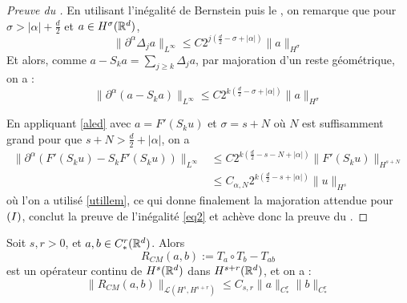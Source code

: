 \documentclass[11pt,a4paper]{article}
\begin{document}
\begin{proof}[Preuve du ]
En utilisant l'inégalité de Bernstein puis le , on remarque que pour $\sigma > |\alpha| + \frac{d}{2}$ et $a\in H^\sigma(\mathbb R^d)$,
\begin{equation*}
\|\partial^\alpha \Delta_j a\|_{L^\infty} \leq C 2^{j(\frac{d}{2}-\sigma+|\alpha|)} \|a\|_{H^\sigma}
\end{equation*}
Et alors, comme $a-S_ka=\sum_{j\geq k} \Delta_j a$, par majoration d'un reste géométrique, on a :
\begin{equation}\label{aled}
\|\partial^\alpha (a-S_k a)\|_{L^\infty} \leq C 2^{k(\frac{d}{2}-\sigma+|\alpha|)} \|a\|_{H^\sigma}
\end{equation}

En appliquant \eqref{aled} avec $a=F'(S_ku)$ et $\sigma = s + N$ où $N$ est suffisamment grand pour que $s+N > \frac{d}{2} + |\alpha|$, on a 
\begin{align*}
\|\partial^\alpha (F'(S_ku)-S_k F'(S_ku))\|_{L^\infty} &\leq C 2^{k(\frac{d}{2}-s-N+|\alpha|)} \|F'(S_ku)\|_{H^{s+N}} \\
& \leq  C_{\alpha,N} 2^{k(\frac{d}{2}-s+|\alpha|)} \|u\|_{H^s}
\end{align*}
où l'on a utilisé \eqref{utillem}, ce qui donne finalement la majoration attendue pour $(\rom{1})$, conclut la preuve de l'inégalité \eqref{eq2} et achève donc la preuve du .
\end{proof}

\begin{thm}\label{paralin_prod}
Soit $s,r>0$, et $a,b\in C^r_*(\mathbb R^d)$. Alors 
\begin{equation*}
R_{CM}(a,b) := T_a \circ T_b - T_{ab}
\end{equation*}
est un opérateur continu de $H^s(\mathbb R^d)$ dans $H^{s+r}(\mathbb R^d)$, et on a :
\begin{equation*}
\|R_{CM}(a,b)\|_{\mathcal{L}(H^s,H^{s+r})} \leq C_{s,r} \|a\|_{C^r_*}\|b\|_{C^r_*}
\end{equation*}
\end{thm}
\end{document}
